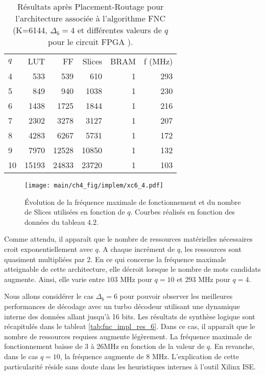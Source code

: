 \begin{table}[!htb]
	\centering
	\caption{Résultats après Placement-Routage pour l'architecture associée à l'algorithme FNC (K=6144, 
	$\Delta_b = 4$ et différentes valeurs de $q$ pour le circuit FPGA  ). }
	\label{tab:fnc_impl_res_4}
	\begin{tabular}{lrrrrr} 
		\toprule
		$q$ & LUT   & FF    & Slices & BRAM & f (MHz) \\ 	\cmidrule(r){1-1}\cmidrule(l){2-6}
		4   &  533  &  539  & 610    & 1	& 293     \\
		5   &  849  &  940  & 1038   & 1	& 230     \\
		6   & 1438  & 1725  & 1844   & 1    & 216     \\
		7   & 2302  & 3278  & 3127   & 1	& 207     \\
		8   & 4283  & 6267  & 5731   & 1    & 172     \\
		9   & 7970	& 12528 & 10850  & 1    & 132     \\
		10  & 15193 & 24833 & 23720  & 1    & 103     \\
		\bottomrule 
	\end{tabular}
\end{table}

\begin{figure}[!ht]
	\centering
	\texttt{[image: main/ch4\_fig/implem/xc6\_4.pdf]}
	\caption{Évolution de la fréquence maximale de fonctionnement et du nombre de Slices utilisées en fonction de $q$.
	Courbes réalisés en fonction des données du tableau $4.2$. \label{fig:fnc_impl_res}}
\end{figure}

Comme attendu, il apparaît que le nombre de ressources matérielles nécessaires croit exponentiellement avec $q$. A chaque incrément
de $q$, les ressources sont quasiment multipliées par 2. En ce qui concerne la fréquence maximale atteignable de cette 
architecture, elle décroit lorsque le nombre de mots candidats augmente. Ainsi, elle varie entre $103$ MHz pour $q=10$ 
et $293$ MHz pour $q=4$. 

Nous allons considérer le cas $\Delta_b = 6$ pour pouvoir observer les meilleures performances de décodage avec un turbo décodeur 
utilisant une dynamique interne des données allant jusqu'à 16 bits. Les résultats de synthèse logique sont récapitulés dans le
tableat \ref{tab:fnc_impl_res_6}. Dans ce cas, il apparaît que le nombre de ressources requises augmente légèrement. La 
fréquence maximale de fonctionnement baisse de 3 à 26MHz en fonction de la valeur de $q$. En revanche, dans le cas 
$q=10$, la fréquence augmente de 8 MHz. L'explication de cette particularité réside sans doute dans 
les heuristiques internes à l'outil Xilinx ISE. 

